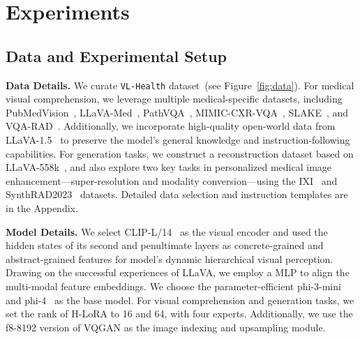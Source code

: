 \section{Experiments}
\label{Experiments}

\subsection{Data and Experimental Setup}
\noindent\textbf{Data Details.} We curate \texttt{VL-Health} dataset~(see Figure~\ref{fig:data}). 
For medical visual comprehension, 
we leverage multiple medical-specific datasets, including PubMedVision~\cite{chen2024huatuogpt}, LLaVA-Med~\cite{li2024llava}, PathVQA~\cite{he2020pathvqa}, MIMIC-CXR-VQA~\cite{bae2024mimic}, SLAKE~\cite{liu2021slake}, and VQA-RAD~\cite{lau2018dataset}. Additionally, we incorporate high-quality open-world data from LLaVA-1.5~\cite{liu2024improved} to preserve the model's general knowledge and instruction-following capabilities.
For generation tasks, we construct a reconstruction dataset based on LLaVA-558k~\cite{liu2024improved}, and also explore two key tasks in personalized medical image enhancement—super-resolution and modality conversion—using the IXI~\cite{IXI} and SynthRAD2023~\cite{thummerer2023synthrad2023} datasets. Detailed data selection and instruction templates are in the Appendix.

\noindent\textbf{Model Details.} We select CLIP-L/14~\cite{radford2021learning} as the visual encoder and used the hidden states of its second and penultimate layers as concrete-grained and abstract-grained features for model's dynamic hierarchical visual perception. Drawing on the successful experiences of LLaVA, we employ a MLP to align the multi-modal feature embeddings. We choose the parameter-efficient phi-3-mini~\cite{abdin2024phi} and phi-4~\cite{abdin2024phi} as the base model. For visual comprehension and generation tasks, we set the rank of H-LoRA to 16 and 64, with four experts. Additionally, we use the f8-8192 version of VQGAN as the image indexing and upsampling module.
\vspace{-3mm}

